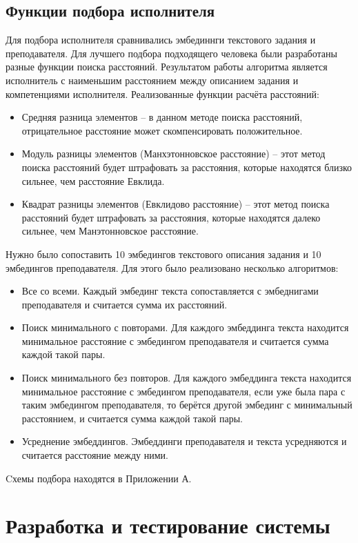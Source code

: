 \documentclass[PI,KR]{HSEUniversity}
\begin{document}
\section{Функции подбора исполнителя}
Для подбора исполнителя сравнивались эмбединнги текстового задания и преподавателя. Для лучшего подбора подходящего человека были разработаны разные функции поиска расстояний. Результатом работы алгоритма является исполнитель с наименьшим расстоянием между описанием задания и компетенциями исполнителя. Реализованные функции расчёта расстояний:
\begin{itemize}
	\item Средняя разница элементов -- в данном методе поиска расстояний, отрицательное расстояние может скомпенсировать положительное.
	\item Модуль разницы элементов (Манхэтонновское расстояние) -- этот метод поиска расстояний будет штрафовать за расстояния, которые находятся близко сильнее, чем расстояние Евклида.
	\item Квадрат разницы элементов  (Евклидово расстояние) --  этот метод поиска расстояний будет штрафовать за расстояния, которые находятся далеко сильнее, чем Манэтонновское расстояние.
\end{itemize}
Нужно было сопоставить 10 эмбедингов текстового описания задания и 10 эмбедингов преподавателя. Для этого было реализовано несколько алгоритмов:
\begin{itemize}
	\item Все со всеми. Каждый эмбединг текста сопоставляется с эмбеднигами преподавателя и считается сумма их расстояний.
	\item Поиск минимального с повторами. Для каждого эмбеддинга текста находится минимальное расстояние с эмбедингом преподавателя и считается сумма каждой такой пары.
	\item Поиск минимального без повторов. Для каждого эмбеддинга текста находится минимальное расстояние с эмбедингом преподавателя, если уже была пара с таким эмбедингом преподавателя, то берётся другой эмбединг с минимальный расстоянием, и считается сумма каждой такой пары.
	\item Усреднение эмбеддингов. Эмбеддинги преподавателя и текста усредняются и считается расстояние между ними.
\end{itemize}
Cхемы подбора находятся в Приложении А.
\chapter{Разработка и тестирование системы}
\end{document}
